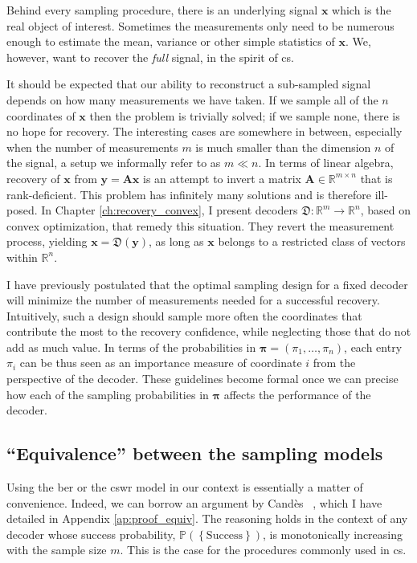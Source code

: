 Behind every sampling procedure, there is an underlying signal $\mathbf{x}$ which is the real object of interest. Sometimes the measurements only need to be numerous enough to estimate the mean, variance or other simple statistics of $\mathbf{x}$. We, however, want to recover the \emph{full} signal, in the spirit of \acrfull{cs}.

It should be expected that our ability to reconstruct a sub-sampled signal depends on how many measurements we have taken. If we sample all of the $n$ coordinates of $\mathbf{x}$ then the problem is trivially solved; if we sample none, there is no hope for recovery. The interesting cases are somewhere in between, especially when the number of measurements $m$ is much smaller than the dimension $n$ of the signal, a setup we informally refer to as $m \ll n$. In terms of linear algebra, recovery of $\mathbf{x}$ from $\mathbf{y} = \mathbf{Ax}$ is an attempt to invert a matrix $\mathbf{A} \in \mathbb{R}^{m \times n}$ that is rank-deficient. This problem has infinitely many solutions and is therefore ill-posed. In Chapter \ref{ch:recovery_convex}, I present decoders $\mathfrak{D} : \mathbb{R}^{m} \to \mathbb{R}^{n}$, based on convex optimization, that remedy this situation. They revert the measurement process, yielding $\mathbf{x} = \mathfrak{D}(\mathbf{y})$, as long as $\mathbf{x}$ belongs to a restricted class of vectors within $\mathbb{R}^{n}$.

I have previously postulated that the optimal sampling design for a fixed decoder will minimize the number of measurements needed for a successful recovery. Intuitively, such a design should sample more often the coordinates that contribute the most to the recovery confidence, while neglecting those that do not add as much value. In terms of the probabilities in $\bm{\pi} = (\pi_1, \dots, \pi_n)$, each entry $\pi_i$ can be thus seen as an importance measure of coordinate $i$ from the perspective of the decoder. These guidelines become formal once we can precise how each of the sampling probabilities in $\bm{\pi}$ affects the performance of the decoder.


\subsection{``Equivalence'' between the sampling models}\label{sec:samp_equiv}

Using the \acrshort{ber} or the \acrshort{cswr} model in our context is essentially a matter of convenience. Indeed, we can borrow an argument by Cand\`es \etal~\cite[Appendix]{candes2011a}, which I have detailed in Appendix \ref{ap:proof_equiv}. The reasoning holds in the context of any decoder whose success probability, $\mathbb{P} \left ( \left \{ \text{Success} \right \}\right )$, is monotonically increasing with the sample size $m$. This is the case for the procedures commonly used in \acrlong{cs}.


